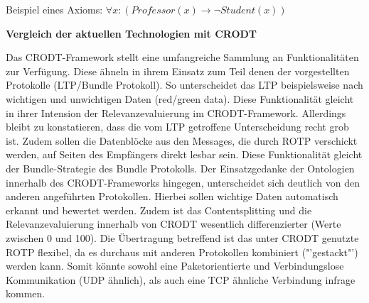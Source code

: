    Beispiel eines Axioms:\newline
   $\forall x : (Professor(x) \rightarrow \neg Student(x))$   
      
\textbf{Vergleich der aktuellen Technologien mit CRODT}

Das CRODT-Framework stellt eine umfangreiche Sammlung an Funktionalit{\"a}ten
zur Verf{\"u}gung. Diese {\"a}hneln in ihrem Einsatz zum Teil denen der
vorgestellten Protokolle (LTP/Bundle Protokoll). So unterscheidet das LTP
beispielsweise nach wichtigen und unwichtigen Daten (red/green data). Diese
Funktionalit{\"a}t gleicht in ihrer Intension der Relevanzevaluierung im
CRODT-Framework. Allerdings bleibt zu konstatieren, dass die vom LTP getroffene
Unterscheidung recht grob ist. Zudem sollen die
Datenbl{\"o}cke aus den Messages, die durch ROTP verschickt werden, auf Seiten
des Empf{\"a}ngers direkt lesbar sein. Diese Funktionalit{\"a}t gleicht der
Bundle-Strategie des Bundle Protokolls. Der Einsatzgedanke der Ontologien
innerhalb des CRODT-Frameworks hingegen, unterscheidet sich deutlich von den
anderen angef{\"u}hrten Protokollen. Hierbei sollen wichtige Daten automatisch
erkannt und bewertet werden. Zudem ist das Contentsplitting und die
Relevanzevaluierung innerhalb von CRODT wesentlich differenzierter (Werte
zwischen 0 und 100). Die {\"U}bertragung betreffend ist das unter \gls{CRODT}
genutzte \gls{ROTP} flexibel, da es durchaus mit anderen Protokollen kombiniert
("'gestackt"') werden kann. Somit k{\"o}nnte sowohl eine Paketorientierte und
Verbindungslose Kommunikation (UDP {\"a}hnlich), als auch eine TCP {\"a}hnliche
Verbindung infrage kommen.
